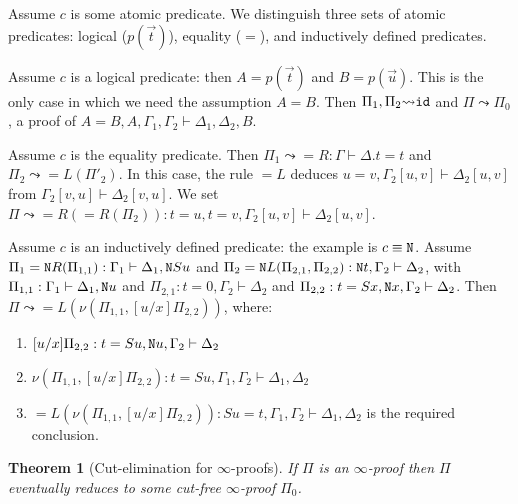 \documentclass[a4paper,12pt]{article}
\newtheorem{theorem}{Theorem}[section]
\newcommand{\Nat}               { {\tt N}  }
\newcommand{\id}              { {\tt id} }
\newcommand{\reduces}         { {\leadsto} }
\newcommand{\eqL}     {= \! \!  \!  L}
\newcommand{\eqR}    {= \! \!  \!  R}
\begin{document}
Assume $c$ is some atomic predicate. We distinguish three sets of atomic predicates: logical ($p(\vec{t})$), equality ($=$), and inductively defined predicates. 

Assume $c$ is a logical predicate: then $A = p(\vec{t})$ and $B = p(\vec{u})$. This is the only case in which we need the assumption $A=B$. 
Then $\Pi_1, \Pi_2 \reduces \id$ and $\Pi \reduces \Pi_0$, a proof of $A=B, A, \Gamma_1, \Gamma_2 \vdash \Delta_1, \Delta_2, B$.

Assume $c$ is the equality predicate. Then $\Pi_1 \reduces \eqR : \Gamma \vdash \Delta. t=t$ and $\Pi_2 \reduces \eqL(\Pi'_2)$. In this case, the rule $\eqL$ deduces $u=v,\Gamma_2[u,v] \vdash \Delta_2[u,v]$ from $\Gamma_2[v,u] \vdash \Delta_2[v,u]$. 
We set $\Pi \reduces \eqR(\eqR(\Pi_2)): t=u, t=v,\Gamma_2[u,v] \vdash \Delta_2[u,v]$. 

Assume $c$ is an inductively defined predicate: the example is $c \equiv \Nat$. 
Assume  $\Pi_1 = \Nat R(\Pi_{1,1}) :\Gamma_1 \vdash \Delta_1, \Nat Su$ and $\Pi_2 = \Nat L(\Pi_{2,1}, \Pi_{2,2}):\Nat t, \Gamma_2 \vdash \Delta_2$, with $\Pi_{1,1} : \Gamma_1 \vdash \Delta_1, \Nat u$ and $\Pi_{2,1}: t=0, \Gamma_2 \vdash \Delta_2$  and $\Pi_{2,2}: t=Sx, \Nat x, \Gamma_2 \vdash \Delta_2$. Then $\Pi \reduces \eqL(\nu(\Pi_{1,1}, [u/x]\Pi_{2,2}))$, where:
\begin{enumerate}
\item
$[u/x]\Pi_{2,2}: t=Su, \Nat u, \Gamma_2 \vdash \Delta_2$
\item
$\nu(\Pi_{1,1}, [u/x]\Pi_{2,2}) : t=Su, \Gamma_1, \Gamma_2 \vdash \Delta_1,  \Delta_2 $ 
\item
$\eqL(\nu(\Pi_{1,1}, [u/x]\Pi_{2,2})): Su=t, \Gamma_1, \Gamma_2 \vdash \Delta_1,  \Delta_2 $
is the required conclusion.
\end{enumerate}



\begin{theorem}[Cut-elimination for $\infty$-proofs] 
If $\Pi$ is an $\infty$-proof then $\Pi$ eventually reduces to some cut-free $\infty$-proof $\Pi_0$. 
\end{theorem}
\end{document}
